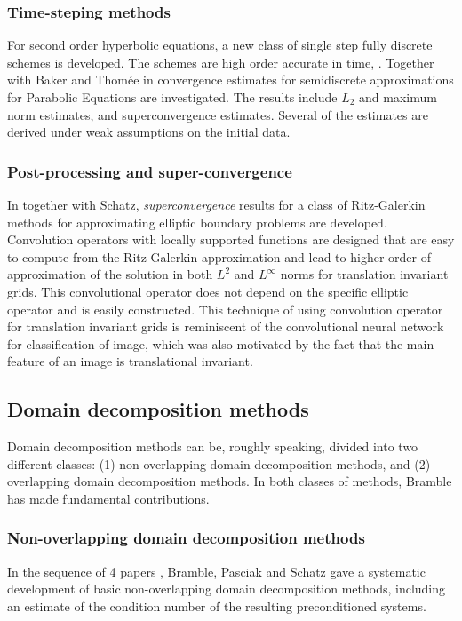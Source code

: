 \documentclass[CJK,11pt]{amsart}
\theoremstyle{definition}
\begin{document}
\begin{CJK*}{UTF8}{gbsn}
\subsubsection{Time-steping methods}  For second order hyperbolic equations, a new class of single step fully discrete schemes is developed. The schemes  are high order accurate in time,  \cite{baker1979semidiscrete}.  Together with Baker and Thom\'{e}e in \cite{baker1977single} convergence estimates for semidiscrete  approximations for Parabolic Equations
are investigated. The results include $L_2 $  and maximum norm estimates,  and superconvergence estimates.  Several of the estimates are derived  under weak assumptions on the initial data.



\subsubsection{Post-processing and super-convergence} In
\cite{bramble1977higher} together with Schatz, {\it superconvergence}
results for a class of Ritz-Galerkin methods for approximating
elliptic boundary problems are developed.  Convolution operators with
locally supported functions are designed that are easy to compute from
the Ritz-Galerkin approximation and lead to higher order of
approximation of the solution in both $L^2$ and $L^\infty$ norms for
translation invariant grids.  This convolutional operator does not
depend on the specific elliptic operator and is easily constructed.
This technique of using convolution operator for translation invariant
grids is reminiscent of the convolutional neural network~\cite{lecun1998gradient} for
classification of image, which was also motivated by the fact that the
main feature of an image is translational invariant.



\subsection{Domain decomposition methods}
Domain decomposition methods can be, roughly speaking, divided into
two different classes: (1) non-overlapping domain decomposition
methods, and (2) overlapping domain decomposition methods.  In both
classes of methods, Bramble has made fundamental contributions.

\subsubsection{Non-overlapping domain decomposition methods}
In the sequence of 4 papers \cite{bramble1986construction, bramble1987construction, bramble1988construction, bramble1989construction}, Bramble, Pasciak and Schatz gave a systematic development of basic non-overlapping domain decomposition methods, including an estimate of 
the condition number of the resulting preconditioned systems. 


\end{CJK*}
\end{document}
